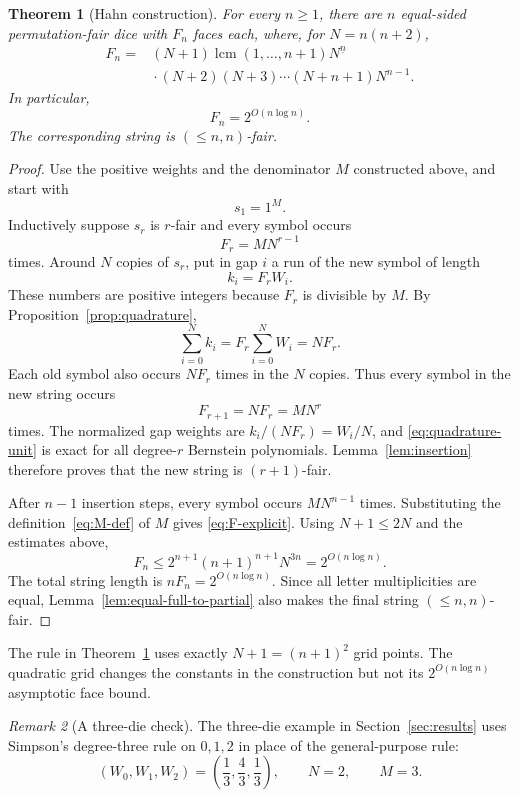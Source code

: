 \documentclass[11pt]{article}
\newtheorem{theorem}{Theorem}[section]
\theoremstyle{definition}
\theoremstyle{remark}
\newtheorem{remark}[theorem]{Remark}
\newcommand{\fall}[2]{#1^{\underline{#2}}}
\DeclareMathOperator{\lcm}{lcm}
\begin{document}
\begin{theorem}[Hahn construction]\label{thm:main}
For every \(n\geq1\), there are \(n\) equal-sided permutation-fair dice
with \(F_n\) faces each, where, for \(N=n(n+2)\),
\begin{equation}\label{eq:F-explicit}
  \boxed{\begin{aligned}
  F_n={}&(N+1)\lcm(1,\ldots,n+1)\fall{N}{n}\\
        &{}\cdot(N+2)(N+3)\cdots(N+n+1)N^{n-1}.
  \end{aligned}}
\end{equation}
In particular,
\[
  F_n=2^{O(n\log n)}.
\]
The corresponding string is \((\leq n,n)\)-fair.
\end{theorem}

\begin{proof}
Use the positive weights and the denominator \(M\) constructed above, and
start with
\[
  s_1=1^M.
\]
Inductively suppose \(s_r\) is \(r\)-fair and every symbol occurs
\[
  F_r=MN^{r-1}
\]
times.  Around \(N\) copies of \(s_r\), put in gap \(i\) a run of the new
symbol of length
\begin{equation}\label{eq:k-i}
  k_i=F_rW_i.
\end{equation}
These numbers are positive integers because \(F_r\) is divisible by \(M\).
By Proposition~\ref{prop:quadrature},
\[
  \sum_{i=0}^Nk_i=F_r\sum_{i=0}^NW_i=NF_r.
\]
Each old symbol also occurs \(NF_r\) times in the \(N\) copies.  Thus every
symbol in the new string occurs
\[
  F_{r+1}=NF_r=MN^r
\]
times.  The normalized gap weights are \(k_i/(NF_r)=W_i/N\), and
\eqref{eq:quadrature-unit} is exact for all degree-\(r\) Bernstein
polynomials.  Lemma~\ref{lem:insertion} therefore proves that the new string
is \((r+1)\)-fair.

After \(n-1\) insertion steps, every symbol occurs \(MN^{n-1}\) times.
Substituting the definition~\eqref{eq:M-def} of \(M\) gives
\eqref{eq:F-explicit}.  Using \(N+1\leq2N\) and the estimates above,
\[
  F_n\leq2^{n+1}(n+1)^{n+1}N^{3n}=2^{O(n\log n)}.
\]
The total string length is \(nF_n=2^{O(n\log n)}\).  Since all letter
multiplicities are equal, Lemma~\ref{lem:equal-full-to-partial} also makes the
final string \((\leq n,n)\)-fair.
\end{proof}

The rule in Theorem~\ref{thm:main} uses exactly \(N+1=(n+1)^2\) grid
points.  The quadratic grid changes the constants in the construction but
not its \(2^{O(n\log n)}\) asymptotic face bound.

\begin{remark}[A three-die check]
The three-die example in Section~\ref{sec:results} uses Simpson's
degree-three rule on \(0,1,2\) in place of the general-purpose rule:
\[
  (W_0,W_1,W_2)=\left(\frac13,\frac43,\frac13\right),
  \qquad N=2,\qquad M=3.
\]
\end{remark}
\end{document}
